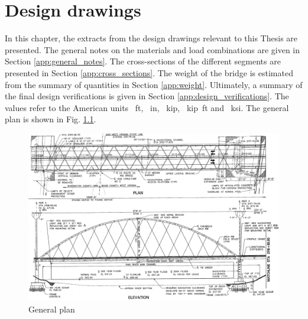 \chapter{Design drawings}
In this chapter, the extracts from the design drawings relevant to this Thesis are presented. The general notes on the materials and load combinations are given in Section \ref{app:general_notes}. The cross-sections of the different segments are presented in Section \ref{app:cross_sections}. The weight of the bridge is estimated from the summary of quantities in Section \ref{app:weight}. Ultimately, a summary of the final design verifications is given in Section \ref{app:design_verifications}. The values refer to the American units \SI{}{ft}, \SI{}{in}, \SI{}{kip}, \SI{}{kip ft} and \SI{}{ksi}. The general plan is shown in Fig. \ref{fig:general_plan}.
\begin{figure}[H]
    \centering
    \includegraphics[width=\textwidth]{overleaf/Appendix/Design drawings/General Plan.png}
    \caption{General plan}
    \label{fig:general_plan}
\end{figure}

